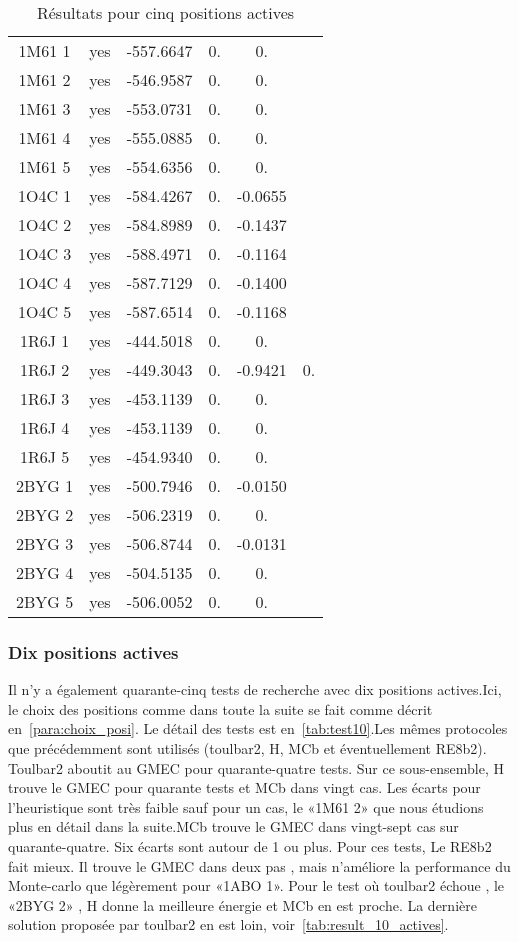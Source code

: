 \begin{table}[h]
\begin{tabular}{cccccc}
        1M61 1 & yes &  -557.6647 & 0. & 0. &  \\
        1M61 2 & yes &  -546.9587 & 0. & 0. &  \\
        1M61 3 & yes &  -553.0731 & 0. & 0. &  \\
        1M61 4 & yes &  -555.0885 & 0. & 0. &  \\
        1M61 5 & yes &  -554.6356 & 0. & 0. &  \\
        1O4C 1 & yes &  -584.4267 & 0. & -0.0655 &  \\
        1O4C 2 & yes &  -584.8989 & 0. & -0.1437 &  \\
        1O4C 3 & yes &  -588.4971 & 0. & -0.1164 &  \\
        1O4C 4 & yes &  -587.7129 & 0. & -0.1400 &  \\
        1O4C 5 & yes &  -587.6514 & 0. & -0.1168 &  \\
        1R6J 1 & yes &  -444.5018 & 0. & 0. &  \\
        1R6J 2 & yes &  -449.3043 & 0. & -0.9421 & 0. \\
        1R6J 3 & yes &  -453.1139 & 0. & 0. &  \\
        1R6J 4 & yes &  -453.1139 & 0. & 0. &  \\
        1R6J 5 & yes &  -454.9340 & 0. & 0. &  \\
        2BYG 1 & yes &  -500.7946 & 0. & -0.0150 &  \\
        2BYG 2 & yes &  -506.2319 & 0. & 0. &  \\
        2BYG 3 & yes &  -506.8744 & 0. & -0.0131 &  \\
        2BYG 4 & yes &  -504.5135 & 0. & 0. &  \\
        2BYG 5 & yes &  -506.0052 & 0. & 0. &  \\
        \bottomrule
      \end{tabular}      
 \caption{Résultats pour cinq positions actives}
\label{tab:result_5_actives}
\end{table}

   \subsubsection{Dix positions actives}
Il n'y a également quarante-cinq tests de recherche avec dix positions actives.Ici, le choix des positions comme dans toute la suite se fait comme décrit en~\ref{para:choix_posi}. Le détail des tests est en~\ref{tab:test10}.Les mêmes protocoles que précédemment sont utilisés (toulbar2, H, MCb et éventuellement RE8b2). Toulbar2 aboutit au GMEC pour quarante-quatre tests. Sur ce sous-ensemble, H trouve le GMEC pour quarante tests et MCb dans vingt cas. Les écarts pour l'heuristique sont très faible sauf pour un cas, le «1M61 2» que nous étudions plus en détail dans la suite.MCb trouve le GMEC dans vingt-sept cas sur quarante-quatre. Six écarts sont autour de 1 ou plus. Pour ces tests, Le RE8b2 fait mieux. Il trouve le  GMEC dans deux pas , mais n'améliore la performance du Monte-carlo que légèrement pour «1ABO 1». Pour le test où toulbar2 échoue , le «2BYG 2» , H donne la meilleure énergie et MCb en est proche. La dernière solution proposée par toulbar2 en est loin, voir~\ref{tab:result_10_actives}. 

